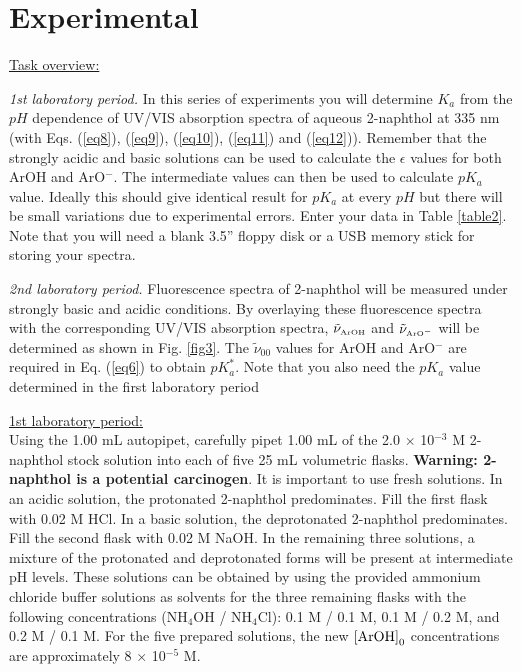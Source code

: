\documentclass[byrevtex,amssymb,aps,pra,floatfix,letterpaper]{revtex4}
\begin{document}
\section{Experimental}

\noindent
\underline{Task overview:}\\

\vspace{0.25cm}

\noindent
\textit{1st laboratory period.} In this series of experiments you will determine $K_a$ from the $pH$ dependence of UV/VIS absorption spectra of aqueous 2-naphthol at 335 nm (with Eqs. (\ref{eq8}), (\ref{eq9}), (\ref{eq10}), (\ref{eq11}) and (\ref{eq12})). Remember that the strongly acidic and basic solutions can be used to calculate the $\epsilon$ values for both ArOH and ArO$^-$. The intermediate values can then be used to calculate $pK_a$ value. Ideally this should give identical result for $pK_a$ at every $pH$ but there will be small variations due to experimental errors. Enter your data in Table \ref{table2}. Note that you will need a blank 3.5'' floppy disk or a USB memory stick for storing your spectra.\\

\vspace{0.25cm}

\noindent
\textit{2nd laboratory period.} Fluorescence spectra of 2-naphthol will be measured under strongly basic and acidic conditions. By overlaying these fluorescence spectra with the corresponding UV/VIS absorption spectra, $\tilde{\nu}_\textnormal{\tiny ArOH}$ and $\tilde{\nu}_{\textnormal{\tiny ArO}^-}$ will be determined as shown in Fig. \ref{fig3}. The $\tilde{\nu}_{00}$ values for ArOH and ArO$^-$ are required in Eq. (\ref{eq6}) to obtain $pK_a^*$. Note that you also need the $pK_a$ value determined in the first laboratory period\\

\vspace{0.25cm}

\noindent
\underline{1st laboratory period:}\\

\noindent
Using the 1.00 mL autopipet, carefully pipet 1.00 mL of the 2.0 $\times$ 10$^{-3}$ M 2-naphthol stock solution into each of five 25 mL volumetric flasks. \textbf{Warning: 2-naphthol is a potential carcinogen}. It is important to use fresh solutions. In an acidic solution, the protonated 2-naphthol predominates. Fill the first flask with 0.02 M HCl. In a basic solution, the deprotonated 2-naphthol predominates. Fill the second flask with 0.02 M NaOH. In the remaining three solutions, a mixture of the protonated and deprotonated forms will be present at intermediate pH levels. These solutions can be obtained by using the provided ammonium chloride buffer solutions as solvents for the three remaining flasks with the following concentrations (NH$_4$OH / NH$_4$Cl): 0.1 M / 0.1 M, 0.1 M / 0.2 M, and 0.2 M / 0.1 M. For the five prepared solutions, the new $\left[\textnormal{ArOH}\right]_0$ concentrations are approximately 8 $\times$ 10$^{-5}$ M.
\end{document}
